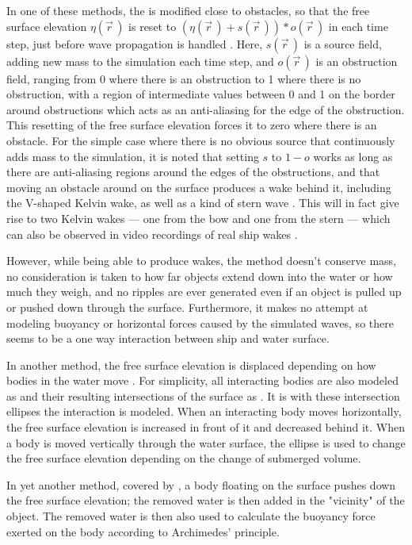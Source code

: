 In one of these methods, the \PDE is modified close to obstacles, so that the free surface elevation $\eta(\vec{r}\,)$ is reset to $(\eta(\vec{r}\,) + s(\vec{r}\,)) * o(\vec{r}\,)$ in each time step, just before wave propagation is handled \citep{Tessendorf2004}. Here, $s(\vec{r}\,)$ is a source field, adding new mass to the simulation each time step, and $o(\vec{r}\,)$ is an obstruction field, ranging from 0 where there is an obstruction to 1 where there is no obstruction, with a region of intermediate values between 0 and 1 on the border around obstructions which acts as an anti-aliasing for the edge of the obstruction. This resetting of the free surface elevation forces it to zero where there is an obstacle. For the simple case where there is no obvious source that continuously adds mass to the simulation, it is noted that setting $s$ to $1-o$ works as long as there are anti-aliasing regions around the edges of the obstructions, and that moving an obstacle around on the surface produces a wake behind it, including the V-shaped Kelvin wake, as well as a kind of stern wave \citep{Tessendorf2004}. This will in fact give rise to two Kelvin wakes --- one from the bow and one from the stern --- which can also be observed in video recordings of real ship wakes \citep{Alivewithpassion2007,MatteoBram2007}.

However, while being able to produce wakes, the method doesn't conserve mass, no consideration is taken to how far objects extend down into the water or how much they weigh, and no ripples are ever generated even if an object is pulled up or pushed down through the surface. Furthermore, it makes no attempt at modeling buoyancy or horizontal forces caused by the simulated waves, so there seems to be a one way interaction between ship and water surface.

In another method, the free surface elevation is displaced depending on how bodies in the water move \citep{Ottosson2011}. For simplicity, all interacting bodies are also modeled as \ellipsoids and their resulting intersections of the surface as \ellipses. It is with these intersection ellipses the interaction is modeled. When an interacting body moves horizontally, the free surface elevation is increased in front of it and decreased behind it. When a body is moved vertically through the water surface, the ellipse is used to change the free surface elevation depending on the change of submerged volume.

In yet another method, covered by \citet{Muller2007}, a body floating on the surface pushes down the free surface elevation; the removed water is then added in the "vicinity" of the object. The removed water is then also used to calculate the buoyancy force exerted on the body according to Archimedes' principle.

